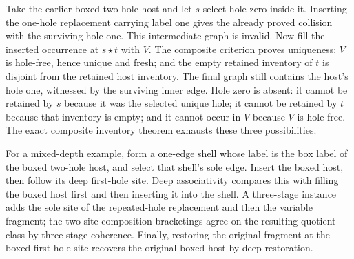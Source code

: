 Take the earlier boxed two-hole host and let $s$ select hole zero inside it.
Inserting the one-hole replacement carrying label one gives the already proved
collision with the surviving hole one. This intermediate graph is invalid.
Now fill the inserted occurrence at $s\star t$ with $V$. The composite criterion
proves uniqueness: $V$ is hole-free, hence unique and fresh; and the empty
retained inventory of $t$ is disjoint from the retained host inventory.
The final graph still contains the host's hole one, witnessed by the surviving
inner edge. Hole zero is absent: it cannot be retained by $s$ because it was
the selected unique hole; it cannot be retained by $t$ because that inventory
is empty; and it cannot occur in $V$ because $V$ is hole-free. The exact composite
inventory theorem exhausts these three possibilities.

For a mixed-depth example, form a one-edge shell whose label is the box label
of the boxed two-hole host, and select that shell's sole edge. Insert the boxed
host, then follow its deep first-hole site. Deep associativity compares this
with filling the boxed host first and then inserting it into the shell.
A three-stage instance adds the sole site of the repeated-hole replacement and
then the variable fragment; the two site-composition bracketings agree on the
resulting quotient class by three-stage coherence. Finally, restoring the
original fragment at the boxed first-hole site recovers the original boxed
host by deep restoration.
